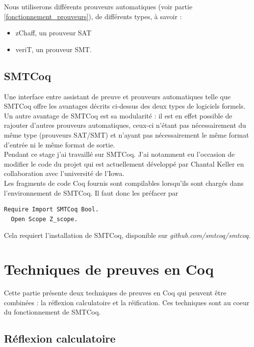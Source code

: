 \documentclass[11pt]{article}
\begin{document}
Nous utiliserons différents prouveurs automatiques (voir partie \ref{fonctionnement_prouveurs}), de différents types, à savoir : 
\begin{itemize}
    \item zChaff, un prouveur SAT
    \item veriT, un prouveur SMT.
\end{itemize}


\subsection{SMTCoq}

Une interface entre assistant de preuve et prouveurs automatiques telle que SMTCoq offre les avantages décrits ci-dessus des deux types de logiciels formels. Un autre avantage de SMTCoq est sa modularité : il est en effet possible de rajouter d'autres prouveurs automatiques, ceux-ci n'étant pas nécessairement du même type (prouveurs SAT/SMT) et n'ayant pas nécessairement le même format d'entrée ni le même format de sortie. \\

Pendant ce stage j'ai travaillé sur SMTCoq. J'ai notamment eu l'occasion de modifier le code du projet qui est actuellement développé par Chantal Keller en collaboration avec l'université de l'Iowa. \\

Les fragments de code Coq fournis sont compilables lorsqu'ils sont chargés dans l'environnement de SMTCoq. Il faut donc les préfacer par
\begin{lstlisting}[frame=single]
  Require Import SMTCoq Bool.
  Open Scope Z_scope.
\end{lstlisting}
Cela requiert l'installation de SMTCoq, disponible sur \textit{github.com/smtcoq/smtcoq}.


\newpage

\section{Techniques de preuves en Coq} \label{coq}

Cette partie présente deux techniques de preuves en Coq qui peuvent être combinées : la réflexion calculatoire et la réification. Ces techniques sont au coeur du fonctionnement de SMTCoq.


\subsection{Réflexion calculatoire}
\end{document}
